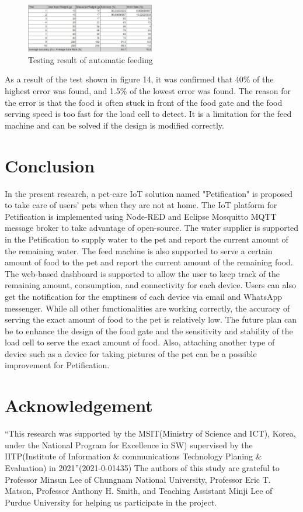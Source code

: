 ﻿\documentclass[conference]{IEEEtran}
\begin{document}
\begin{figure}[htbp]
\centerline{\includegraphics[width=0.5\textwidth]{./images/Feeding_sheet.jpg}}
\caption{Testing result of automatic feeding}
\label{fig}
\end{figure}

As a result of the test shown in figure 14, it was confirmed that 40\% of the highest error was found, and 1.5\% of the lowest error was found.
The reason for the error is that the food is often stuck in front of the food gate and the food serving speed is too fast for the load cell to detect.
It is a limitation for the feed machine and can be solved if the design is modified correctly.

\section{Conclusion}
In the present research, a pet-care IoT solution named "Petification" is proposed to take care of users’ pets when they are not at home.
The IoT platform for Petification is implemented using Node-RED and Eclipse Mosquitto MQTT message broker to take advantage of open-source.
The water supplier is supported in the Petification to supply water to the pet and report the current amount of the remaining water.
The feed machine is also supported to serve a certain amount of food to the pet and report the current amount of the remaining food.
The web-based dashboard is supported to allow the user to keep track of the remaining amount, consumption, and connectivity for each device.
Users can also get the notification for the emptiness of each device via email and WhatsApp messenger.
While all other functionalities are working correctly, the accuracy of serving the exact amount of food to the pet is relatively low.
The future plan can be to enhance the design of the food gate and the sensitivity and stability of the load cell to serve the exact amount of food.
Also, attaching another type of device such as a device for taking pictures of the pet can be a possible improvement for Petification.

\section{Acknowledgement}
“This research was supported by the MSIT(Ministry of Science and ICT), Korea, under the National Program for Excellence in SW) supervised by the IITP(Institute of Information \& communications Technology Planing \& Evaluation) in 2021”(2021-0-01435)
The authors of this study are grateful to Professor Minsun Lee of Chungnam National University, Professor Eric T. Matson, Professor Anthony H. Smith, and Teaching Assistant Minji Lee of Purdue University for helping us participate in the project.
\end{document}
